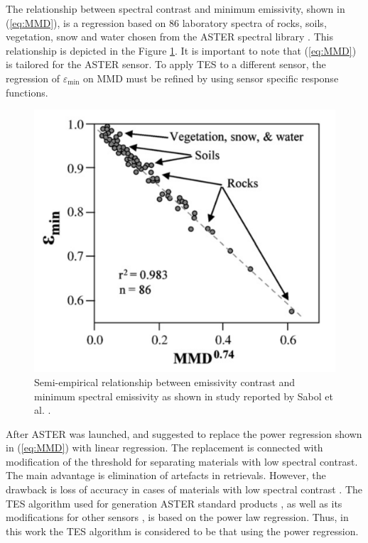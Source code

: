 The relationship between spectral contrast and minimum emissivity, shown in (\ref{eq:MMD}), is a regression based on 86 laboratory spectra of rocks, soils, vegetation, snow and water chosen from the ASTER spectral library \cite{BH09}. This relationship is depicted in the Figure \ref{fig:EpsMinMMD}. It is important to note that (\ref{eq:MMD}) is tailored for the ASTER sensor. To apply  {TES to a} different sensor,  {the} regression of $\varepsilon_\mathrm{min}$ on MMD  {must be} refined by using sensor specific response functions. 

\begin{figure}[htb]
	\centering
	\includegraphics[scale=0.2]{pics/Chapter_03/EpsMinMMD.png}
	\vspace{1.5 em}
	\caption{Semi-empirical relationship between emissivity contrast and minimum spectral emissivity as shown in study reported by Sabol et al. \cite{SG09}.}
	\label{fig:EpsMinMMD}
\end{figure}

After ASTER was launched, \cite{GG06} and \cite{SG09} suggested to replace the power regression shown in (\ref{eq:MMD}) with linear regression. The replacement is connected with modification of the threshold for separating materials with low spectral contrast. The main advantage is elimination of artefacts in retrievals. However, the drawback is loss of accuracy in cases of materials with low spectral contrast \cite{SG09}. The TES algorithm used for generation ASTER standard products \cite{bjorn-personal-communication}, as well as its modifications for other sensors \cite{SJ06, JS12, WX11, SJ02, JS14, HH11, MB02, hulley-hyspiri-2011}, is based on the power law regression. Thus, in this work the TES algorithm is considered to be that using the power regression.

